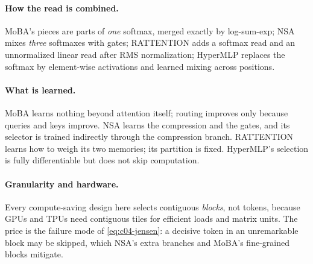 \paragraph{How the read is combined.} MoBA's pieces are parts of \emph{one} softmax, merged
exactly by log-sum-exp; NSA mixes \emph{three} softmaxes with gates; RATTENTION adds a softmax read
and an unnormalized linear read after RMS normalization; HyperMLP replaces the softmax by
element-wise activations and learned mixing across positions.

\paragraph{What is learned.} MoBA learns nothing beyond attention itself; routing improves only
because queries and keys improve. NSA learns the compression and the gates, and its selector is
trained indirectly through the compression branch. RATTENTION learns how to weigh its two memories;
its partition is fixed. HyperMLP's selection is fully differentiable but does not skip computation.

\paragraph{Granularity and hardware.} Every compute-saving design here selects contiguous
\emph{blocks}, not tokens, because GPUs and TPUs need contiguous tiles for efficient loads and matrix
units. The price is the failure mode of \eqref{eq:c04-jensen}: a decisive token in an
unremarkable block may be skipped, which NSA's extra branches and MoBA's fine-grained blocks
mitigate.

